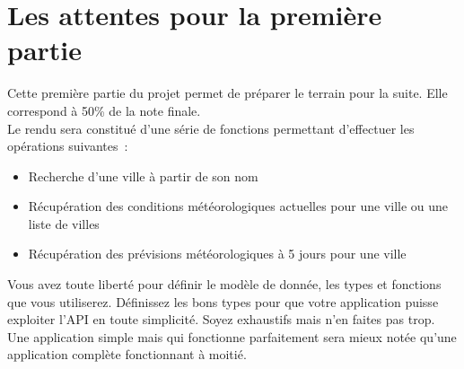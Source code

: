 \documentclass[a4paper,11pt]{scrartcl}
\begin{document}
\section*{Les attentes pour la première partie}

Cette première partie du projet permet de préparer le terrain pour la suite. Elle correspond à 50\% de la note finale.\\

Le rendu sera constitué d'une série de fonctions permettant d'effectuer les opérations suivantes :
\begin{itemize}
\item Recherche d'une ville à partir de son nom
\item Récupération des conditions météorologiques actuelles pour une ville ou une liste de villes
\item Récupération des prévisions météorologiques à 5 jours pour une ville
\end{itemize}

Vous avez toute liberté pour définir le modèle de donnée, les types et fonctions que vous utiliserez. Définissez les bons types pour que votre application puisse exploiter l'API en toute simplicité. Soyez exhaustifs mais n'en faites pas trop. Une application simple mais qui fonctionne parfaitement sera mieux notée qu'une application complète fonctionnant à moitié.
\end{document}

